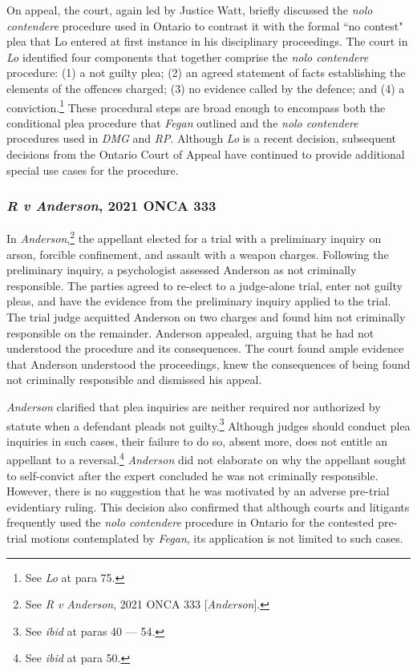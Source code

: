 On appeal, the court, again led by Justice Watt, briefly discussed the \textit{nolo contendere} procedure used in Ontario to contrast it with the formal ``no contest" plea that Lo entered at first instance in his disciplinary proceedings. The court in \textit{Lo} identified four components that together comprise the \textit{nolo contendere} procedure: (1) a not guilty plea; (2) an agreed statement of facts establishing the elements of the offences charged; (3) no evidence called by the defence; and (4) a conviction.\footnote{See \textit{Lo} at para 75.} These procedural steps are broad enough to encompass both the conditional plea procedure that \textit{Fegan} outlined and the \textit{nolo contendere} procedures used in \textit{DMG} and \textit{RP}. Although \textit{Lo} is a recent decision, subsequent decisions from the Ontario Court of Appeal have continued to provide additional special use cases for the procedure.

\subsubsection{\textit{R v Anderson}, 2021 ONCA 333}

In \textit{Anderson},\footnote{See \textit{R v Anderson}, 2021 ONCA 333 [\textit{Anderson}].} the appellant elected for a trial with a preliminary inquiry on arson, forcible confinement, and assault with a weapon charges. Following the preliminary inquiry, a psychologist assessed Anderson as not criminally responsible. The parties agreed to re-elect to a judge-alone trial, enter not guilty pleas, and have the evidence from the preliminary inquiry applied to the trial. The trial judge acquitted Anderson on two charges and found him not criminally responsible on the remainder. Anderson appealed, arguing that he had not understood the procedure and its consequences. The court found ample evidence that Anderson understood the proceedings, knew the consequences of being found not criminally responsible and dismissed his appeal. 

\textit{Anderson} clarified that plea inquiries are neither required nor authorized by statute when a defendant pleads not guilty.\footnote{See \textit{ibid} at paras 40 — 54.} Although judges should conduct plea inquiries in such cases, their failure to do so, absent more, does not entitle an appellant to a reversal.\footnote{See \textit{ibid} at para 50.} \textit{Anderson} did not elaborate on why the appellant sought to self-convict after the expert concluded he was not criminally responsible. However, there is no suggestion that he was motivated by an adverse pre-trial evidentiary ruling. This decision also confirmed that although courts and litigants frequently used the \textit{nolo contendere} procedure in Ontario for the contested pre-trial motions contemplated by \textit{Fegan}, its application is not limited to such cases.

